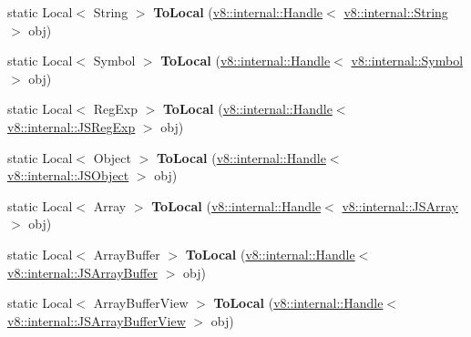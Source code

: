 \begin{DoxyCompactItemize}
\item 
\hypertarget{classv8_1_1_utils_a542c00f40ca2110234f8af6347c18226}{}static Local$<$ String $>$ {\bfseries To\+Local} (\hyperlink{classv8_1_1internal_1_1_handle}{v8\+::internal\+::\+Handle}$<$ \hyperlink{classv8_1_1internal_1_1_string}{v8\+::internal\+::\+String} $>$ obj)\label{classv8_1_1_utils_a542c00f40ca2110234f8af6347c18226}

\item 
\hypertarget{classv8_1_1_utils_a8f80a73e8cb52ce4ce60582f20066656}{}static Local$<$ Symbol $>$ {\bfseries To\+Local} (\hyperlink{classv8_1_1internal_1_1_handle}{v8\+::internal\+::\+Handle}$<$ \hyperlink{classv8_1_1internal_1_1_symbol}{v8\+::internal\+::\+Symbol} $>$ obj)\label{classv8_1_1_utils_a8f80a73e8cb52ce4ce60582f20066656}

\item 
\hypertarget{classv8_1_1_utils_addc955f726ea1afd17380844f36d92c7}{}static Local$<$ Reg\+Exp $>$ {\bfseries To\+Local} (\hyperlink{classv8_1_1internal_1_1_handle}{v8\+::internal\+::\+Handle}$<$ \hyperlink{classv8_1_1internal_1_1_j_s_reg_exp}{v8\+::internal\+::\+J\+S\+Reg\+Exp} $>$ obj)\label{classv8_1_1_utils_addc955f726ea1afd17380844f36d92c7}

\item 
\hypertarget{classv8_1_1_utils_a7e6956f478d4f7e0dce5986a422d1554}{}static Local$<$ Object $>$ {\bfseries To\+Local} (\hyperlink{classv8_1_1internal_1_1_handle}{v8\+::internal\+::\+Handle}$<$ \hyperlink{classv8_1_1internal_1_1_j_s_object}{v8\+::internal\+::\+J\+S\+Object} $>$ obj)\label{classv8_1_1_utils_a7e6956f478d4f7e0dce5986a422d1554}

\item 
\hypertarget{classv8_1_1_utils_a574263d874f1c510592f745e3e26089b}{}static Local$<$ Array $>$ {\bfseries To\+Local} (\hyperlink{classv8_1_1internal_1_1_handle}{v8\+::internal\+::\+Handle}$<$ \hyperlink{classv8_1_1internal_1_1_j_s_array}{v8\+::internal\+::\+J\+S\+Array} $>$ obj)\label{classv8_1_1_utils_a574263d874f1c510592f745e3e26089b}

\item 
\hypertarget{classv8_1_1_utils_ac51eb1eb431ba42ecf23ca81e6e2f4f1}{}static Local$<$ Array\+Buffer $>$ {\bfseries To\+Local} (\hyperlink{classv8_1_1internal_1_1_handle}{v8\+::internal\+::\+Handle}$<$ \hyperlink{classv8_1_1internal_1_1_j_s_array_buffer}{v8\+::internal\+::\+J\+S\+Array\+Buffer} $>$ obj)\label{classv8_1_1_utils_ac51eb1eb431ba42ecf23ca81e6e2f4f1}

\item 
\hypertarget{classv8_1_1_utils_ad4a90baf574da81c4906d7ea564e1d60}{}static Local$<$ Array\+Buffer\+View $>$ {\bfseries To\+Local} (\hyperlink{classv8_1_1internal_1_1_handle}{v8\+::internal\+::\+Handle}$<$ \hyperlink{classv8_1_1internal_1_1_j_s_array_buffer_view}{v8\+::internal\+::\+J\+S\+Array\+Buffer\+View} $>$ obj)\label{classv8_1_1_utils_ad4a90baf574da81c4906d7ea564e1d60}


\end{DoxyCompactItemize}
